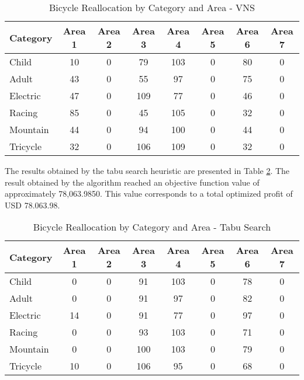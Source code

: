 \documentclass[]{article}
\begin{document}
\begin{table}[H]
	\centering
	
	\begin{tabular}{l|ccccccc}
		\hline
		\textbf{Category} & \textbf{Area 1} & \textbf{Area 2} & \textbf{Area 3} & \textbf{Area 4} & \textbf{Area 5} & \textbf{Area 6} & \textbf{Area 7} \\
		\hline
		Child      & 10    & 0     & 79    & 103   & 0     & 80    & 0     \\
		Adult      & 43    & 0     & 55    & 97    & 0     & 75    & 0     \\
		Electric   & 47    & 0     & 109   & 77    & 0     & 46    & 0     \\
		Racing     & 85    & 0     & 45    & 105   & 0     & 32    & 0     \\
		Mountain   & 44    & 0     & 94    & 100   & 0     & 44    & 0     \\
		Tricycle   & 32    & 0     & 106   & 109   & 0     & 32    & 0     \\
		\hline
		
	\end{tabular}
	\caption{Bicycle Reallocation by Category and Area - VNS}
	\label{tab:resultados-vns}
\end{table}


The results obtained by the tabu search heuristic are presented in Table \ref{tab:resultados-ts}. The result obtained by the algorithm reached an objective function value of approximately 78,063.9850. This value corresponds to a total optimized profit of USD 78.063.98. 


\begin{table}[H]
	\centering
	
	\begin{tabular}{l|ccccccc}
		\hline
		\textbf{Category} & \textbf{Area 1} & \textbf{Area 2} & \textbf{Area 3} & \textbf{Area 4} & \textbf{Area 5} & \textbf{Area 6} & \textbf{Area 7} \\
		\hline
			Child      & 0     & 0     & 91    & 103   & 0     & 78    & 0     \\
			Adult      & 0     & 0     & 91    & 97    & 0     & 82    & 0     \\
			Electric   & 14    & 0     & 91    & 77    & 0     & 97    & 0     \\
			Racing     & 0     & 0     & 93    & 103   & 0     & 71    & 0     \\
			Mountain   & 0     & 0     & 100   & 103   & 0     & 79    & 0     \\
			Tricycle   & 10    & 0     & 106   & 95    & 0     & 68    & 0     \\
		\hline
	\end{tabular}
	\caption{Bicycle Reallocation by Category and Area - Tabu Search}
	\label{tab:resultados-ts}
\end{table}
\end{document}
